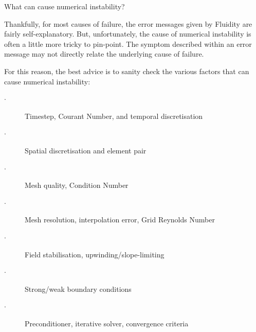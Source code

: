 \documentclass[t]{beamer}
\begin{document}

\begin{frame}{What can cause numerical instability?}

Thankfully, for most causes of failure, the error messages given by Fluidity are fairly self-explanatory.
But, unfortunately, the cause of numerical instability is often a little more tricky to pin-point.
The symptom described within an error message may not directly relate the underlying cause of failure.

\vspace{1ex}
For this reason, the best advice is to sanity check the various factors that can cause numerical instability:
\begin{description}
 \item[$\cdot$] Timestep, Courant Number, and temporal discretisation
 \item[$\cdot$] Spatial discretisation and element pair
 \item[$\cdot$] Mesh quality, Condition Number
 \item[$\cdot$] Mesh resolution, interpolation error, Grid Reynolds Number
 \item[$\cdot$] Field stabilisation, upwinding/slope-limiting
 \item[$\cdot$] Strong/weak boundary conditions
 \item[$\cdot$] Preconditioner, iterative solver, convergence criteria
\end{description}

\end{frame}

\end{document}
